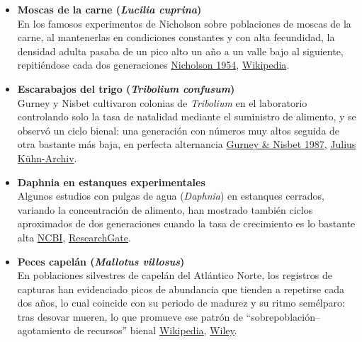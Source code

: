 \documentclass[
  11pt,
  a4paper,
  DIV=11,
  numbers=noendperiod]{scrreprt}
\begin{document}
\begin{itemize}
\item
  \textbf{Moscas de la carne (\emph{Lucilia cuprina})}\\
  En los famosos experimentos de Nicholson sobre poblaciones de moscas
  de la carne, al mantenerlas en condiciones constantes y con alta
  fecundidad, la densidad adulta pasaba de un pico alto un año a un
  valle bajo al siguiente, repitiéndose cada dos generaciones
  \href{https://www.jstor.org/stable/827141?utm_source=chatgpt.com}{Nicholson
  1954},
  \href{https://en.wikipedia.org/wiki/Alexander_John_Nicholson?utm_source=chatgpt.com}{Wikipedia}.
\item
  \textbf{Escarabajos del trigo (\emph{Tribolium confusum})}\\
  Gurney y Nisbet cultivaron colonias de \emph{Tribolium} en el
  laboratorio controlando solo la tasa de natalidad mediante el
  suministro de alimento, y se observó un ciclo bienal: una generación
  con números muy altos seguida de otra bastante más baja, en perfecta
  alternancia
  \href{https://desharnais.sciencecourseware.org/reprints/JAE1987.pdf?utm_source=chatgpt.com}{Gurney
  \& Nisbet 1987},
  \href{https://ojs.openagrar.de/index.php/JKA/article/view/10631/9697?utm_source=chatgpt.com}{Julius
  Kühn-Archiv}.
\item
  \textbf{Daphnia en estanques experimentales}\\
  Algunos estudios con pulgas de agua (\emph{Daphnia}) en estanques
  cerrados, variando la concentración de alimento, han mostrado también
  ciclos aproximados de dos generaciones cuando la tasa de crecimiento
  es lo bastante alta
  \href{https://www.ncbi.nlm.nih.gov/books/NBK2042/?utm_source=chatgpt.com}{NCBI},
  \href{https://www.researchgate.net/publication/31983971_Large-amplitude_cycles_of_Daphnia_and_its_algal_prey_in_enriched_environments?utm_source=chatgpt.com}{ResearchGate}.
\item
  \textbf{Peces capelán (\emph{Mallotus villosus})}\\
  En poblaciones silvestres de capelán del Atlántico Norte, los
  registros de capturas han evidenciado picos de abundancia que tienden
  a repetirse cada dos años, lo cual coincide con su periodo de madurez
  y su ritmo semélparo: tras desovar mueren, lo que promueve ese patrón
  de ``sobrepoblación--agotamiento de recursos'' bienal
  \href{https://en.wikipedia.org/wiki/Capelin?utm_source=chatgpt.com}{Wikipedia},
  \href{https://onlinelibrary.wiley.com/doi/full/10.1002/edn3.415?utm_source=chatgpt.com}{Wiley}.
\end{itemize}
\end{document}
